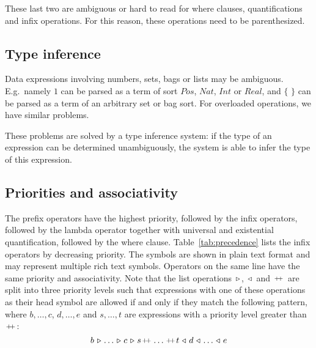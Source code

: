 \documentclass[a4paper,fleqn]{article}
\newcommand{\frm}[1]{\mbox{\ensuremath{#1}}}
\newcommand{\f}[1]{\ensuremath{\mathit{#1}}}
\newcommand{\set}[1]{\ensuremath{\{\,#1\,\}}}
\newcommand{\cons}{\ensuremath{\hspace{0.12em}\triangleright\hspace{0.08em}}}
\newcommand{\snoc}{\ensuremath{\hspace{0.08em}\triangleleft\hspace{0.12em}}}
\newcommand{\concat}{\ensuremath{\hspace{0.12em}\raisebox{0.2ex}
{\text{\scriptsize+}\!\text{\scriptsize+}}\hspace{0.12em}}}
\newcommand{\srtpos}{\f{Pos}}
\newcommand{\srtnat}{\f{Nat}}
\newcommand{\srtint}{\f{Int}}
\newcommand{\srtreal}{\f{Real}}
\begin{document}
\noindent
These last two are ambiguous or hard to read for where clauses, quantifications
and infix operations. For this reason, these operations need to be
parenthesized.

\subsection{Type inference}

Data expressions involving numbers, sets, bags or lists may be ambiguous. E.g.\
namely \frm{1} can be parsed as a term of sort \frm{\srtpos}, \frm{\srtnat},
\frm{\srtint} or \frm{\srtreal}, and \frm{\set{}} can be parsed as a term of an arbitrary set or
bag sort. For overloaded operations, we have similar problems.

These problems are solved by a type inference system: if the type of an
expression can be determined unambiguously, the system is able to infer the
type of this expression.

\subsection{Priorities and associativity}

The prefix operators have the highest priority, followed by the infix
operators, followed by the lambda operator together with universal and
existential quantification, followed by the where clause.
Table~\ref{tab:precedence} lists the infix operators by decreasing priority.
The symbols are shown in plain text format and may represent multiple rich text
symbols. Operators on the same line have the same priority and associativity.
Note that the list operations \frm{\cons}, \frm{\snoc} and \frm{\concat} are
split into three priority levels such that expressions with one of these
operations as their head symbol are allowed if and only if they match the
following pattern, where \frm{b, \ldots, c}, \frm{d, \ldots, e} and \frm{s,
\ldots, t} are expressions with a priority level greater than \frm{\concat}:
\[
b \cons \dots \cons c \cons s \concat \dots \concat t \snoc d \snoc \dots
\snoc e
\]
 
\end{document}
